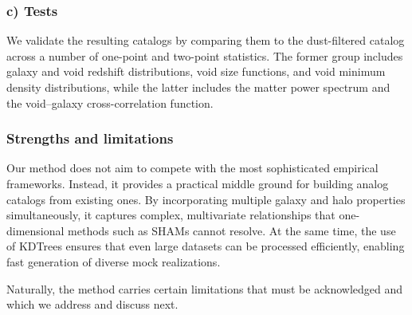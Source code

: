 \documentclass[]{aa} %
\begin{document}
\subsubsection*{c) Tests} We validate the resulting catalogs by comparing them to the dust-filtered catalog across a number of one-point and two-point statistics. The former group includes galaxy and void redshift distributions, void size functions, and void minimum density distributions, while the latter includes the matter power spectrum and the void–galaxy cross-correlation function. 


\subsubsection*{Strengths and limitations}
Our method does not aim to compete with the most sophisticated empirical frameworks. Instead, it provides a practical middle ground for building analog catalogs from existing ones. By incorporating multiple galaxy and halo properties simultaneously, it captures complex, multivariate relationships that one-dimensional methods such as SHAMs cannot resolve. At the same time, the use of KDTrees ensures that even large datasets can be processed efficiently, enabling fast generation of diverse mock realizations. 

Naturally, the method carries certain limitations that must be acknowledged and which we address and discuss next.
\end{document}
